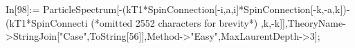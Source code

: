 In[98]:= ParticleSpectrum[-(kT1*SpinConnection[-i,a,i]*SpinConnection[-k,-a,k])-(kT1*SpinConnecti (*omitted 2552 characters for brevity*) ,k,-k]],TheoryName->StringJoin["Case",ToString[56]],Method->"Easy",MaxLaurentDepth->3];